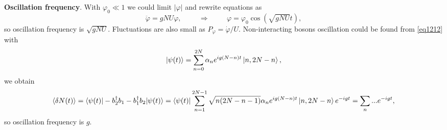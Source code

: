 \textbf{Oscillation frequency}. With $\varphi_0 \ll 1$ we could limit $|\varphi|$ and rewrite equations as
\begin{equation*}
	\ddot{\varphi} = g N U \varphi,
	\hspace{1cm} \Rightarrow \hspace{1cm}
	\varphi = \varphi_0 \cos(\sqrt{gNU} t),
\end{equation*}
so oscillation frequency is $\sqrt{g N U}$. Fluctuations are also small as $P_\varphi = \dot{\varphi}/U$. Non-interacting bosons oscillation could be found from \eqref{eq1212} with
\begin{equation*}
	\left| \psi(t) \right\rangle = \sum_{n=0}^{2N} \alpha_n e^{i g (N-n) t} \left| n,2N-n \right\rangle,
\end{equation*}
we obtain
\begin{equation*}
	\langle \delta N(t)\rangle = \bk{\psi(t)}[- b_2\D b_1 - b_1\D b_2]{\psi(t)} = \bra{\psi(t)} \sum_{n=1}^{2N-1} \sqrt{n(2N-n-1)} \alpha_n  e^{i g (N-n)t}\ket{n,2N-n} e^{-i g t} = \sum_n ... e^{-igt},
\end{equation*}
so oscillation frequency is $g$.






